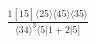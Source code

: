 \documentclass[varwidth, border=5pt]{standalone}
\begin{document}
\begin{my}
$\begin{gathered}
\scriptscriptstyle\frac{1[15]⟨25⟩⟨45⟩⟨35⟩}{⟨34⟩^3⟨5|1+2|5]}
\end{gathered}$
\end{my}
\end{document}
